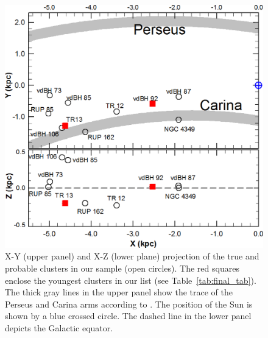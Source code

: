 \documentclass[draft]{aa}
\begin{document}
\begin{figure}[ht]
    \centering
    \includegraphics[width=\hsize]{../figs/xy_xz.png}
\caption{X-Y (upper panel) and X-Z (lower plane) projection of the true and
probable clusters in our sample (open circles). The red squares
enclose the youngest clusters in our list (see Table~\ref{tab:final_tab}).
The thick gray lines in the upper panel show the trace of the Perseus and
Carina arms according to \cite{valle_2005}.
The position of the Sun is shown by a blue crossed circle.
The dashed line in the lower panel depicts the Galactic equator.}
\label{fig68}
\end{figure}
\end{document}
